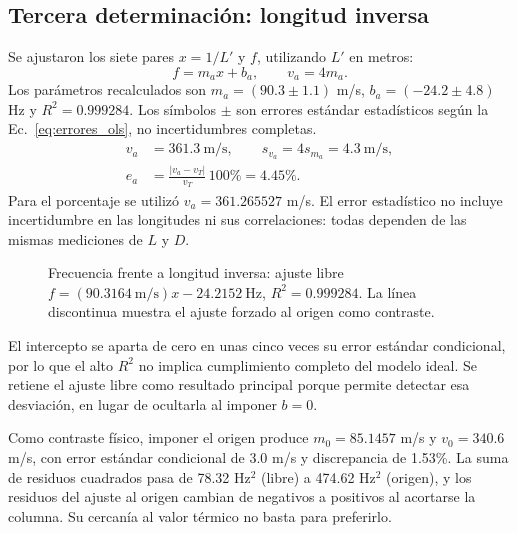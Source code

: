 \subsection{Tercera determinación: longitud inversa}
Se ajustaron los siete pares $x=1/L'$ y $f$, utilizando $L'$ en metros:
\begin{equation}
f=m_ax+b_a,\qquad v_a=4m_a.
\label{eq:ajuste_agua}
\end{equation}
Los parámetros recalculados son $m_a=(90.3\pm1.1)$ m/s, $b_a=(-24.2\pm4.8)$ Hz y $R^2=0.999284$. Los símbolos $\pm$ son errores estándar estadísticos según la Ec.~\eqref{eq:errores_ols}, no incertidumbres completas.
\begin{equation}
\begin{aligned}
v_a&=361.3\ \mathrm{m/s},\qquad s_{v_a}=4s_{m_a}=4.3\ \mathrm{m/s},\\
e_a&=\frac{|v_a-v_T|}{v_T}\,100\%=4.45\%.
\end{aligned}
\label{eq:va}
\end{equation}
Para el porcentaje se utilizó $v_a=361.265527$ m/s. El error estadístico no incluye incertidumbre en las longitudes ni sus correlaciones: todas dependen de las mismas mediciones de $L$ y $D$.
\begin{figure}[!t]
\centering

\caption{Frecuencia frente a longitud inversa: ajuste libre $f=(90.3164\ \mathrm{m/s})x-24.2152\ \mathrm{Hz}$, $R^2=0.999284$. La línea discontinua muestra el ajuste forzado al origen como contraste.}
\label{fig:agua_inversa}
\end{figure}
El intercepto se aparta de cero en unas cinco veces su error estándar condicional, por lo que el alto $R^2$ no implica cumplimiento completo del modelo ideal. Se retiene el ajuste libre como resultado principal porque permite detectar esa desviación, en lugar de ocultarla al imponer $b=0$.

Como contraste físico, imponer el origen produce $m_0=85.1457$ m/s y $v_0=340.6$ m/s, con error estándar condicional de 3.0 m/s y discrepancia de 1.53\%. La suma de residuos cuadrados pasa de 78.32 Hz$^2$ (libre) a 474.62 Hz$^2$ (origen), y los residuos del ajuste al origen cambian de negativos a positivos al acortarse la columna. Su cercanía al valor térmico no basta para preferirlo.

